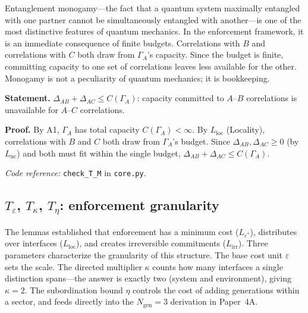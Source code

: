 \documentclass[11pt]{article}
\newcommand{\coderef}[2]{\smallskip\noindent\textit{Code reference:} \texttt{#1} in \texttt{#2}.}
\begin{document}
Entanglement monogamy---the fact that a quantum system maximally entangled with one partner cannot be simultaneously entangled with another---is one of the most distinctive features of quantum mechanics.  In the enforcement framework, it is an immediate consequence of finite budgets.  Correlations with $B$ and correlations with $C$ both draw from $\Gamma_A$'s capacity.  Since the budget is finite, committing capacity to one set of correlations leaves less available for the other.  Monogamy is not a peculiarity of quantum mechanics; it is bookkeeping.

\begin{tcolorbox}[apfbox, title={$T_M$: Interface Monogamy}]
\textbf{Statement.}  $\Delta_{AB} + \Delta_{AC} \le C(\Gamma_A)$: capacity committed to $A$--$B$ correlations is unavailable for $A$--$C$ correlations.

\smallskip\noindent\textbf{Proof.}  By A1, $\Gamma_A$ has total capacity $C(\Gamma_A) < \infty$.  By $L_{\mathrm{loc}}$ (Locality), correlations with $B$ and $C$ both draw from $\Gamma_A$'s budget.  Since $\Delta_{AB}, \Delta_{AC} \ge 0$ (by $L_{\mathrm{nc}}$) and both must fit within the single budget, $\Delta_{AB} + \Delta_{AC} \le C(\Gamma_A)$.

\coderef{check\_T\_M}{core.py}
\end{tcolorbox}


\subsection{\texorpdfstring{$T_\varepsilon$, $T_\kappa$, $T_\eta$}{T epsilon, T kappa, T eta}: enforcement granularity}

The lemmas established that enforcement has a minimum cost ($L_{\varepsilon^*}$), distributes over interfaces ($L_{\mathrm{loc}}$), and creates irreversible commitments ($L_{\mathrm{irr}}$).  Three parameters characterize the granularity of this structure.  The base cost unit $\varepsilon$ sets the scale.  The directed multiplier $\kappa$ counts how many interfaces a single distinction spans---the answer is exactly two (system and environment), giving $\kappa = 2$.  The subordination bound $\eta$ controls the cost of adding generations within a sector, and feeds directly into the $N_{\mathrm{gen}} = 3$ derivation in Paper~4A.
\end{document}
